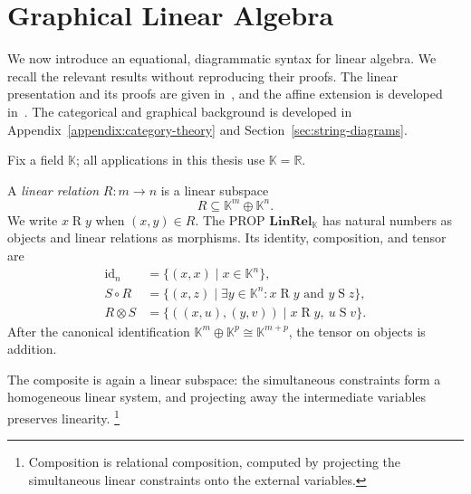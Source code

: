 \begin{figure}[H]
    \centering
    
\end{figure}

\section{Graphical Linear Algebra}\label{sec:linear-algebra}

We now introduce an equational, diagrammatic syntax for linear algebra.
We recall the relevant results without reproducing their proofs. The linear
presentation and its proofs are given in~\cite{bonchi2017interacting}, and the
affine extension is developed in~\cite{bonchi2019affine}.
The categorical and graphical background is developed in
Appendix~\ref{appendix:category-theory} and Section~\ref{sec:string-diagrams}.

Fix a field $\mathbb K$; all applications in this thesis use
$\mathbb K=\mathbb R$.

\begin{definition}\label{def:linear-relations}
A \emph{linear relation} $R:m\to n$ is a linear subspace
\[
 R\subseteq\mathbb K^m\oplus\mathbb K^n.
\]
We write $x\mathrel{R}y$ when $(x,y)\in R$.  The PROP
$\mathbf{LinRel}_{\mathbb K}$ has natural numbers as objects and linear
relations as morphisms.  Its identity, composition, and tensor are
\begin{align*}
 \mathrm{id}_n
   &=\{(x,x)\mid x\in\mathbb K^n\},\\
 S\circ R
   &=\{(x,z)\mid \exists y\in\mathbb K^n:
                    x\mathrel{R}y\text{ and }y\mathrel{S}z\},\\
 R\otimes S
   &=\{((x,u),(y,v))\mid x\mathrel{R}y,
                              \ u\mathrel{S}v\}.
\end{align*}
After the canonical identification
$\mathbb K^m\oplus\mathbb K^p\cong\mathbb K^{m+p}$, the tensor on objects is
addition.
\end{definition}

The composite is again a linear subspace: the simultaneous constraints
form a homogeneous linear system, and projecting away the intermediate
variables preserves linearity.
\footnote{Composition is relational composition, computed by projecting the
    simultaneous linear constraints onto the external variables.}


